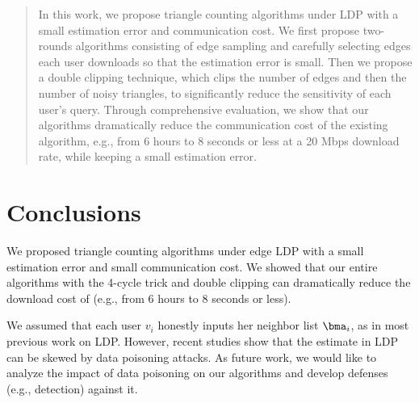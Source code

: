 \begin{abstract}
In this work, we propose triangle counting algorithms under LDP with a small estimation error and communication cost.
We first
propose two-rounds algorithms
consisting of edge sampling and carefully selecting edges each user downloads
so that the estimation error is small.
Then we propose
a double clipping technique,
which clips the number of edges and then the number of noisy triangles,
to significantly reduce the sensitivity of each user's query.
Through comprehensive evaluation, we 
show that our algorithms dramatically reduce the communication cost
of the existing algorithm, e.g., from
6 hours to 8 seconds or less at a 20 Mbps download rate, while keeping
a small estimation error.
\end{abstract}








\section{Conclusions}
\label{chap2-sec:conclusions}
We proposed
triangle counting algorithms under edge LDP with a small estimation error and small communication cost.
We showed that
our entire algorithms with the 4-cycle trick and double clipping
can dramatically reduce the download cost
of
\cite{Imola_USENIX21}
(e.g., from 6 hours to 8 seconds or less). 

We assumed that each user $v_i$ honestly inputs her neighbor list $\bma_i$, as in most previous work on LDP.
However, recent studies \cite{Cao_USENIX21,Cheu21} show that the estimate in LDP can be skewed by data poisoning attacks.
As future work, we would like to analyze the impact of data poisoning on our algorithms and develop defenses (e.g., detection) against it.


